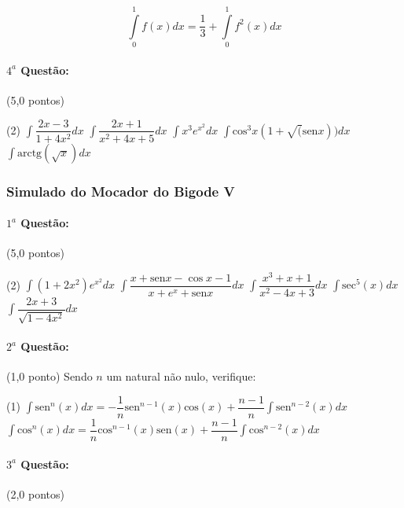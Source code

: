 \documentclass[12pt,a4paper]{article}
\newcommand{\sen}{\mathrm{sen}}
\begin{document}
$$\displaystyle\int\limits_0^1 f(x) dx = \dfrac{1}{3} + \displaystyle\int\limits_0^1 f^2(x) dx $$ 


\paragraph{$4^a$ Questão:} (5,0 pontos)

\begin{tasks}(2)
\task $\displaystyle\int \dfrac{2x-3}{1+4x^2} dx$ 
\task $\displaystyle\int \dfrac{2x+1}{x^2+4x+5}dx$ 
\task $\displaystyle\int x^3e^{x^2}dx$
\task $\displaystyle\int \textrm{cos}^3x(1+\sqrt(\sen{x}))dx$
\task $\displaystyle\int \textrm{arctg}(\sqrt{x})dx$
\end{tasks}


\newpage

\subsubsection{Simulado do Mocador do Bigode V}

\paragraph{$1^a$ Questão:} (5,0 pontos)

\begin{tasks}(2)
\task $\displaystyle\int (1+2x^2)e^{x^2} dx$ 
\task $\displaystyle\int \dfrac{x+\sen{x}-\cos{x}-1}{x+e^x+\sen{x}}dx$ 
\task $\displaystyle\int \dfrac{x^3+x+1}{x^2-4x+3} dx$
\task $\displaystyle\int \textrm{sec}^5(x) dx$
\task $\displaystyle\int \dfrac{2x+3}{\sqrt{1-4x^2}} dx$
\end{tasks}

\paragraph{$2^a$ Questão:} (1,0 ponto)
Sendo $n$ um natural não nulo, verifique:
\begin{tasks}(1)
\task $\displaystyle\int \textrm{sen}^n(x) dx = -\dfrac{1}{n}\textrm{sen}^{n-1}(x)\textrm{cos}(x)+\dfrac{n-1}{n}\displaystyle\int \textrm{sen}^{n-2}(x)dx$ 
\task $\displaystyle\int \textrm{cos}^n(x) dx = \dfrac{1}{n}\textrm{cos}^{n-1}(x)\textrm{sen}(x)+\dfrac{n-1}{n}\displaystyle\int \textrm{cos}^{n-2}(x)dx$
\end{tasks}

\paragraph{$3^a$ Questão:} (2,0 pontos)
\end{document}
